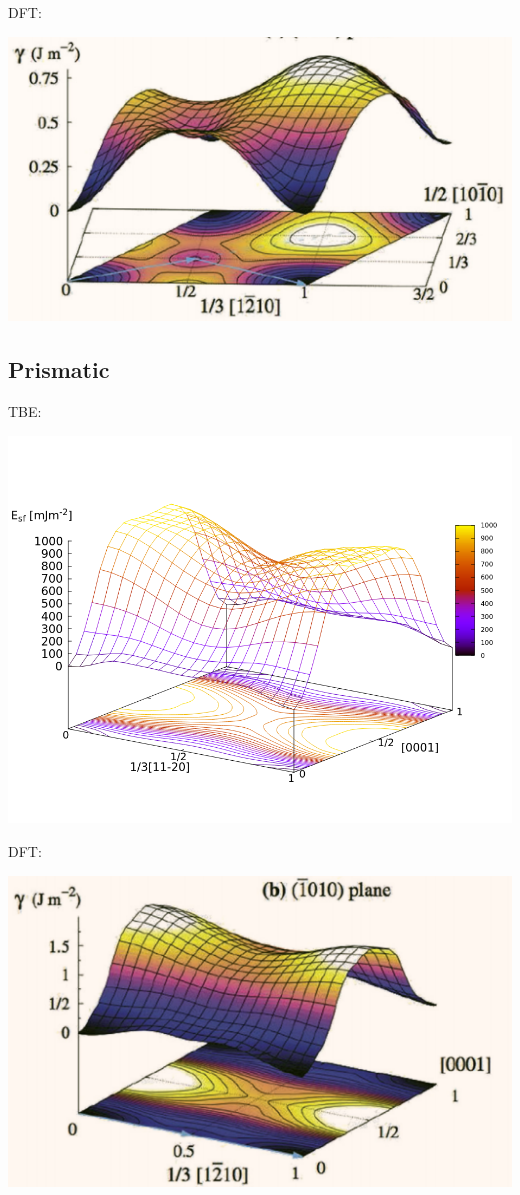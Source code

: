 \documentclass[11pt]{article}
\begin{document}
DFT:
\begin{center}
\includegraphics[width=.9\linewidth]{Images/rodney_basal_ti_gamma_surface.png}
\end{center}

\subsection{Prismatic}
\label{sec:orgfa6258c}

TBE:
\begin{center}
\includegraphics[width=.9\linewidth]{Images/prismatic_gamma_surface_final_model_angle_smaller.png}
\end{center}

DFT:
\begin{center}
\includegraphics[width=.9\linewidth]{Images/rodney_prismatic_ti_gamma_surface.png}
\end{center}
\end{document}
